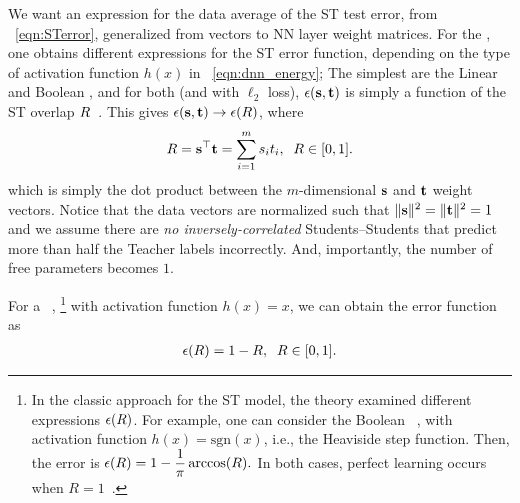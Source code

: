 We want an expression for the data average of the ST test error, from \EQN~\ref{eqn:STerror}, generalized from \Perceptron vectors to NN layer weight matrices.
For the \Perceptron, one obtains different expressions for the ST error function, depending on 
the type of activation function $h(x)$ in \EQN~\ref{eqn:dnn_energy};
The simplest are the Linear and Boolean \Perceptrons, and
for both (and with $\ell_2$ loss),
 $\epsilon({\mathbf{s}},{\mathbf{t}})$ is simply a function of the ST overlap $R$~\cite{SST92}.
This gives $\epsilon({\mathbf{s}}, {\mathbf{t}} )\rightarrow\epsilon(R)$, where
\begin{align}
  \label{eqn:Rdef}
R={\mathbf{s}}^{\top}{\mathbf{t}}=\sum_{i=1}^{m}s_{i}t_{i}, \;\;R\in[0,1].
\end{align}
which is simply the dot product between the $m$-dimensional \Student ${\mathbf{s}}$ and \Teacher ${\mathbf{t}}$ weight vectors.
 Notice that the data vectors are normalized such that $\Vert{\mathbf{s}}\Vert^{2}=\Vert
{\mathbf{t}}\Vert^{2}=1$ and 
we assume there are \emph{no inversely-correlated} Students--Students that predict more than half the Teacher labels incorrectly. And, importantly, the number of free parameters becomes $1$.

For a \LinearPerceptron~\cite{SST92},%
\footnote{In the classic approach for the ST model, the theory examined different expressions $\epsilon(R)$.
For example, one can consider the  Boolean \Perceptron~\cite{SST92,Ros62}, with activation function $h(x)=\mbox{sgn}(x)$, 
i.e., the Heaviside step function. Then, the error is
$
\epsilon(R)=1 - \dfrac{1}{\pi}\arccos(R).
$
In both cases, perfect learning occurs when $R=1$~\cite{SST92}.
}
with activation function $h(x)=x$,  we can obtain the error function as
\begin{align}
\epsilon(R)=1-R,\;\;R\in[0,1].
\label{eqn:LinearPerceptronError}
\end{align}





